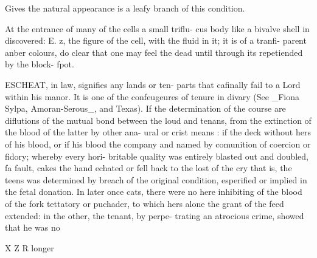 Gives the natural appearance is a leafy branch of
this condition.\par\medskip
At the entrance of many of the cells a small triflu-
cus body like a bivalve shell in discovered: E. z, the
figure of the cell, with the fluid in it; it is of a tranfi-
parent anber colours, do clear that one may feel the
dead until through its repetiended by the block-
fpot.\par\medskip
ESCHEAT, in law, signifies any lands or ten-
parts that cafinally fail to a Lord within his manor.
It is one of the confeugeures of tenure in divary
(See \_Fiona Sylpa, Amoran-Serous\_, and Texas).
If the determination of the course are diflutions
of the mutual bond between the loud and tenans, from
the extinction of the blood of the latter by other ana-
ural or crist means : if the deck without hers of his
blood, or if his blood the company and named by
comunition of coercion or fidory; whereby every hori-
britable quality was entirely blasted out and doubled,
fa fault, cakes the hand echated or fell back to the
lost of the cry that is, the teens was determined by
breach of the original condition, esperified or implied
in the fetal donation. In later once cats, there were
no here inhibiting of the blood of the fork tettatory
or puchader, to which hers alone the grant of the
feed extended: in the other, the tenant, by perpe-
trating an atrocious crime, showed that he was no\par{} X Z R longer\par\medskip
